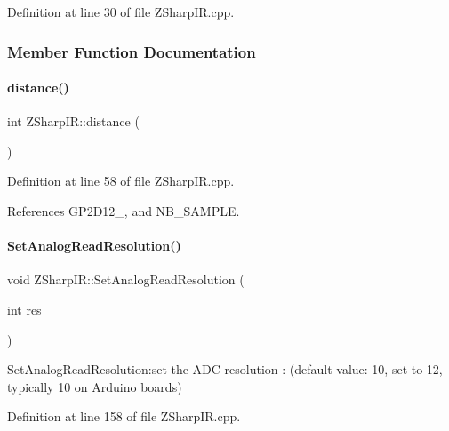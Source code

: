 Definition at line 30 of file Z\+Sharp\+I\+R.\+cpp.



\subsubsection{Member Function Documentation}
\mbox{\label{class_z_sharp_i_r_aae48083d6920e98c1b657de9e03b2254}} 
\paragraph{\texorpdfstring{distance()}{distance()}}
{\footnotesize\ttfamily int Z\+Sharp\+I\+R\+::distance (\begin{DoxyParamCaption}{ }\end{DoxyParamCaption})}



Definition at line 58 of file Z\+Sharp\+I\+R.\+cpp.



References G\+P2\+D12\+\_, and N\+B\+\_\+\+S\+A\+M\+P\+LE.

\mbox{\label{class_z_sharp_i_r_a0121005326fb7d981fcf739730a69ac1}} 
\paragraph{\texorpdfstring{Set\+Analog\+Read\+Resolution()}{SetAnalogReadResolution()}}
{\footnotesize\ttfamily void Z\+Sharp\+I\+R\+::\+Set\+Analog\+Read\+Resolution (\begin{DoxyParamCaption}\item[{int}]{res }\end{DoxyParamCaption})}



Set\+Analog\+Read\+Resolution\+:set the A\+DC resolution \+: (default value\+: 10, set to 12, typically 10 on Arduino boards) 



Definition at line 158 of file Z\+Sharp\+I\+R.\+cpp.

\mbox{\label{class_z_sharp_i_r_a20db1d8e739e9799704e78345f2858a8}} 
